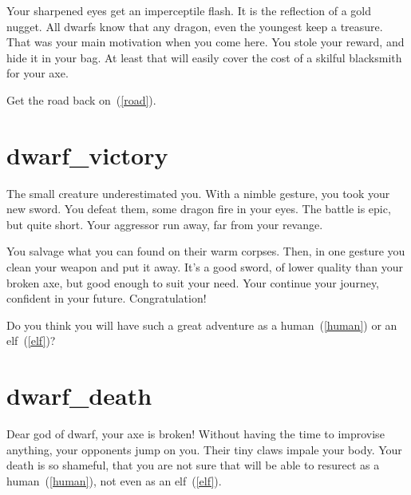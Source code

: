 Your sharpened eyes get an imperceptile flash. It is the reflection of a gold
nugget. All dwarfs know that any dragon, even the youngest keep a treasure. That
was your main motivation when you come here. You stole your reward, and hide it
in your bag. At least that will easily cover the cost of a skilful blacksmith
for your axe.

Get the road back on~(\ref{road}).

\section{dwarf_victory}

The small creature underestimated you. With a nimble gesture, you took your new
sword. You defeat them, some dragon fire in your eyes. The battle is epic, but
quite short. Your aggressor run away, far from your revange.

You salvage what you can found on their warm corpses. Then, in one gesture you
clean your weapon and put it away. It's a good sword, of lower quality than your
broken axe, but good enough to suit your need. Your continue your journey,
confident in your future. Congratulation!

Do you think you will have such a great adventure as a human~(\ref{human}) or
an elf~(\ref{elf})?

\section{dwarf_death}

Dear god of dwarf, your axe is broken! Without having the time to improvise
anything, your opponents jump on you. Their tiny claws impale your body. Your
death is so shameful, that you are not sure that will be able to resurect as a
human~(\ref{human}), not even as an elf~(\ref{elf}).
